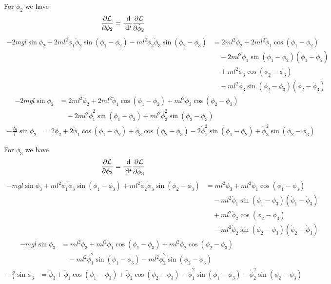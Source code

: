 \documentclass{article}
\renewcommand{\L}{\mathcal{L}}
\begin{document}
\begin{appendices}
    For $\phi_2$ we have
    \begin{align}
        \pD{\L}{\phi_2} &= \D{}{t}\pD{\L}{\dot\phi_2} 
    \end{align}
    \begin{align}
        -2mgl\sin\phi_2 +2ml^2\dot\phi_1\dot\phi_2\sin(\phi_1-\phi_2)
            -ml^2\dot\phi_2\dot\phi_3\sin(\phi_2-\phi_3)
        &= 2ml^2\ddot\phi_2 + 2ml^2\ddot\phi_1\cos(\phi_1-\phi_2) \\
        &\quad - 2ml^2\dot\phi_1\sin(\phi_1-\phi_2)(\dot\phi_1-\dot\phi_2) \\
        &\quad + ml^2\ddot\phi_3\cos(\phi_2-\phi_3) \\
        &\quad - ml^2\dot\phi_3\sin(\phi_2-\phi_3)(\dot\phi_2-\dot\phi_3) 
    \end{align}
    \begin{align}
        -2mgl\sin\phi_2 &= 2ml^2\ddot\phi_2 + 2ml^2\ddot\phi_1\cos(\phi_1-\phi_2)
            + ml^2\ddot\phi_3\cos(\phi_2-\phi_3)  \\
            &\quad - 2ml^2\dot\phi_1^2\sin(\phi_1-\phi_2)
            + ml^2\dot\phi_3^2\sin(\phi_2-\phi_3)
    \end{align}
    \begin{align}
        -\frac{2g}{l}\sin\phi_2 &= 2\ddot\phi_2 + 2\ddot\phi_1\cos(\phi_1-\phi_2)
            + \ddot\phi_3\cos(\phi_2-\phi_3) - 2\dot\phi_1^2\sin(\phi_1-\phi_2)
            + \dot\phi_3^2\sin(\phi_2-\phi_3)   \label{eq_m2}
    \end{align}

    For $\phi_3$ we have
    \begin{align}
        \pD{\L}{\phi_3} &= \D{}{t}\pD{\L}{\dot\phi_3} 
    \end{align}
    \begin{align}
        -mgl\sin\phi_3 +ml^2\dot\phi_1\dot\phi_3\sin(\phi_1-\phi_3)
            +ml^2\dot\phi_2\dot\phi_3\sin(\phi_2-\phi_3)
        &= ml^2\ddot\phi_3 + ml^2\ddot\phi_1\cos(\phi_1-\phi_3) \\
        &\quad - ml^2\dot\phi_1\sin(\phi_1-\phi_3)(\dot\phi_1-\dot\phi_3) \\
        &\quad + ml^2\ddot\phi_2\cos(\phi_2-\phi_3) \\
        &\quad - ml^2\dot\phi_2\sin(\phi_2-\phi_3)(\dot\phi_2-\dot\phi_3) 
    \end{align}
    \begin{align}
        -mgl\sin\phi_3 &= ml^2\ddot\phi_3 + ml^2\ddot\phi_1\cos(\phi_1-\phi_3)
            + ml^2\ddot\phi_2\cos(\phi_2-\phi_3)  \\
            &\quad - ml^2\dot\phi_1^2\sin(\phi_1-\phi_3)
            - ml^2\dot\phi_2^2\sin(\phi_2-\phi_3)
    \end{align}
    \begin{align}
        -\frac{g}{l}\sin\phi_3 &= \ddot\phi_3 + \ddot\phi_1\cos(\phi_1-\phi_3)
            + \ddot\phi_2\cos(\phi_2-\phi_3) - \dot\phi_1^2\sin(\phi_1-\phi_3)
            - \dot\phi_2^2\sin(\phi_2-\phi_3)   \label{eq_m3}
    \end{align}



\end{appendices}
\end{document}
